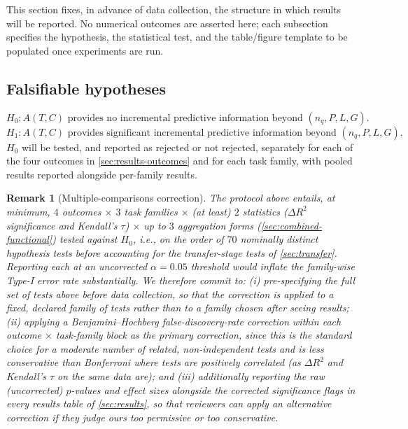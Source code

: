 \documentclass[11pt]{article}
\newtheorem{remark}[theorem]{Remark}
\begin{document}
This section fixes, in advance of data collection, the structure in which results will be reported. No numerical outcomes are asserted here; each subsection specifies the hypothesis, the statistical test, and the table/figure template to be populated once experiments are run.

\subsection{Falsifiable hypotheses}
\[
    H_0: A(T,C) \text{ provides no incremental predictive information beyond } (n_q, P, L, G).
\]
\[
    H_1: A(T,C) \text{ provides significant incremental predictive information beyond } (n_q, P, L, G).
\]
$H_0$ will be tested, and reported as rejected or not rejected, separately for each of the four outcomes in \cref{sec:results-outcomes} and for each task family, with pooled results reported alongside per-family results.

\begin{remark}[Multiple-comparisons correction]
\label{rem:multiple-comparisons}
The protocol above entails, at minimum, $4$ outcomes $\times$ $3$ task families $\times$ (at least) $2$ statistics ($\Delta R^2$ significance and Kendall's $\tau$) $\times$ up to $3$ aggregation forms (\cref{sec:combined-functional}) tested against $H_0$, i.e., on the order of $70$ nominally distinct hypothesis tests before accounting for the transfer-stage tests of \cref{sec:transfer}. Reporting each at an uncorrected $\alpha=0.05$ threshold would inflate the family-wise Type-I error rate substantially. We therefore commit to: (i) pre-specifying the full set of tests above before data collection, so that the correction is applied to a fixed, declared family of tests rather than to a family chosen after seeing results; (ii) applying a Benjamini--Hochberg false-discovery-rate correction within each outcome $\times$ task-family block as the primary correction, since this is the standard choice for a moderate number of related, non-independent tests and is less conservative than Bonferroni where tests are positively correlated (as $\Delta R^2$ and Kendall's $\tau$ on the same data are); and (iii) additionally reporting the raw (uncorrected) $p$-values and effect sizes alongside the corrected significance flags in every results table of \cref{sec:results}, so that reviewers can apply an alternative correction if they judge ours too permissive or too conservative.
\end{remark}
\end{document}
